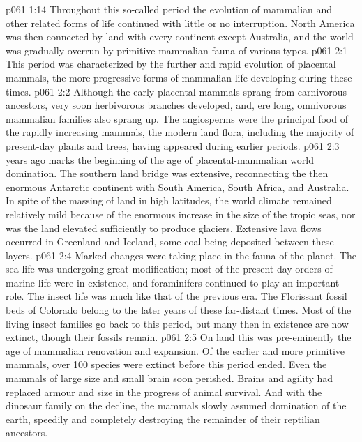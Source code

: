 \vs p061 1:14 \pc Throughout this so\hyp{}called  period the evolution of mammalian and other related forms of life continued with little or no interruption. North America was then connected by land with every continent except Australia, and the world was gradually overrun by primitive mammalian fauna of various types.
\vs p061 2:1 This period was characterized by the further and rapid evolution of placental mammals, the more progressive forms of mammalian life developing during these times.
\vs p061 2:2 Although the early placental mammals sprang from carnivorous ancestors, very soon herbivorous branches developed, and, ere long, omnivorous mammalian families also sprang up. The angiosperms were the principal food of the rapidly increasing mammals, the modern land flora, including the majority of present\hyp{}day plants and trees, having appeared during earlier periods.
\vs p061 2:3 \pc {} years ago marks the beginning of the age of placental\hyp{}mammalian world domination. The southern land bridge was extensive, reconnecting the then enormous Antarctic continent with South America, South Africa, and Australia. In spite of the massing of land in high latitudes, the world climate remained relatively mild because of the enormous increase in the size of the tropic seas, nor was the land elevated sufficiently to produce glaciers. Extensive lava flows occurred in Greenland and Iceland, some coal being deposited between these layers.
\vs p061 2:4 Marked changes were taking place in the fauna of the planet. The sea life was undergoing great modification; most of the present\hyp{}day orders of marine life were in existence, and foraminifers continued to play an important role. The insect life was much like that of the previous era. The Florissant fossil beds of Colorado belong to the later years of these far\hyp{}distant times. Most of the living insect families go back to this period, but many then in existence are now extinct, though their fossils remain.
\vs p061 2:5 On land this was pre\hyp{}eminently the age of mammalian renovation and expansion. Of the earlier and more primitive mammals, over 100 species were extinct before this period ended. Even the mammals of large size and small brain soon perished. Brains and agility had replaced armour and size in the progress of animal survival. And with the dinosaur family on the decline, the mammals slowly assumed domination of the earth, speedily and completely destroying the remainder of their reptilian ancestors.
